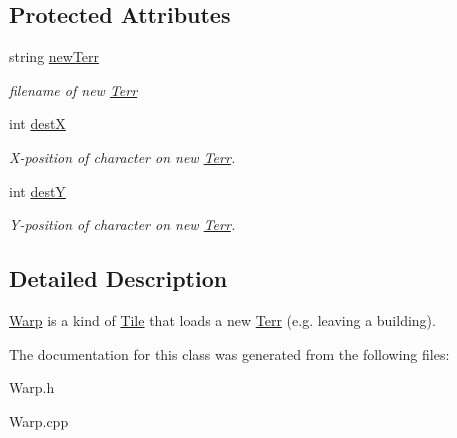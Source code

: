 \subsection*{Protected Attributes}
\begin{DoxyCompactItemize}
\item 
string \hyperlink{class_warp_abbc0edf4c6a9939e0c39c9eb55b8fb1f}{new\+Terr}\hypertarget{class_warp_abbc0edf4c6a9939e0c39c9eb55b8fb1f}{}\label{class_warp_abbc0edf4c6a9939e0c39c9eb55b8fb1f}

\begin{DoxyCompactList}\small\item\em filename of new \hyperlink{class_terr}{Terr} \end{DoxyCompactList}\item 
int \hyperlink{class_warp_a1ea6941153bc9d5f166bb28cb2a57088}{destX}\hypertarget{class_warp_a1ea6941153bc9d5f166bb28cb2a57088}{}\label{class_warp_a1ea6941153bc9d5f166bb28cb2a57088}

\begin{DoxyCompactList}\small\item\em X-\/position of character on new \hyperlink{class_terr}{Terr}. \end{DoxyCompactList}\item 
int \hyperlink{class_warp_a3290d5a86cfed24b596a369a81ad9fa5}{destY}\hypertarget{class_warp_a3290d5a86cfed24b596a369a81ad9fa5}{}\label{class_warp_a3290d5a86cfed24b596a369a81ad9fa5}

\begin{DoxyCompactList}\small\item\em Y-\/position of character on new \hyperlink{class_terr}{Terr}. \end{DoxyCompactList}\end{DoxyCompactItemize}


\subsection{Detailed Description}
\hyperlink{class_warp}{Warp} is a kind of \hyperlink{class_tile}{Tile} that loads a new \hyperlink{class_terr}{Terr} (e.\+g. leaving a building). 

The documentation for this class was generated from the following files\+:\begin{DoxyCompactItemize}
\item 
Warp.\+h\item 
Warp.\+cpp\end{DoxyCompactItemize}
